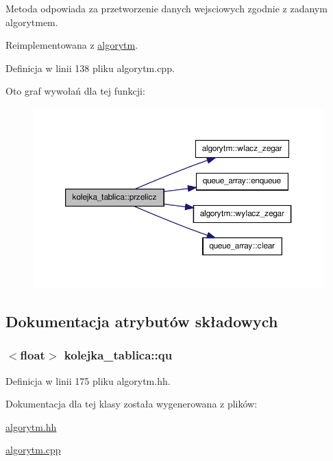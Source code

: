 \-Metoda odpowiada za przetworzenie danych wejsciowych zgodnie z zadanym algorytmem. 



\-Reimplementowana z \hyperlink{classalgorytm_af3f92bf537b1f2e1f93173983e838449}{algorytm}.



\-Definicja w linii 138 pliku algorytm.\-cpp.



\-Oto graf wywołań dla tej funkcji\-:\nopagebreak
\begin{figure}[H]
\begin{center}
\leavevmode
\includegraphics[width=350pt]{classkolejka__tablica_aad6baa28ce61111666e70df7d6ac4f86_cgraph}
\end{center}
\end{figure}




\subsection{\-Dokumentacja atrybutów składowych}
\hypertarget{classkolejka__tablica_a7fd15c7c7a0fa3649042ec634b2b8d4f}{
\subsubsection[{qu}]{$<$float$>$ {\bf kolejka\-\_\-tablica\-::qu}}}\label{classkolejka__tablica_a7fd15c7c7a0fa3649042ec634b2b8d4f}


\-Definicja w linii 175 pliku algorytm.\-hh.



\-Dokumentacja dla tej klasy została wygenerowana z plików\-:\begin{DoxyCompactItemize}
\item 
\hyperlink{algorytm_8hh}{algorytm.\-hh}\item 
\hyperlink{algorytm_8cpp}{algorytm.\-cpp}\end{DoxyCompactItemize}

